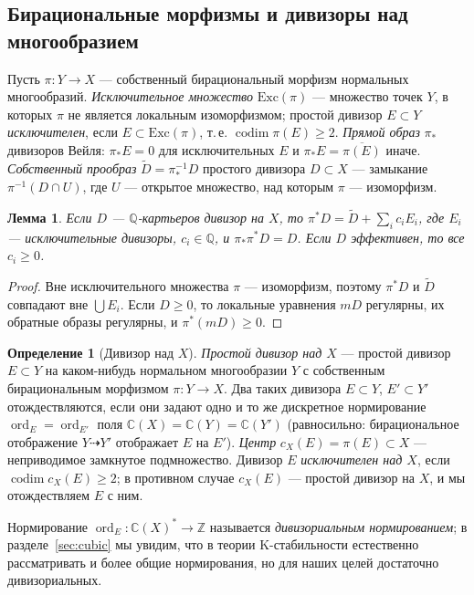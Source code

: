 \documentclass[11pt,a4paper]{article}
\theoremstyle{plain}
\newtheorem{lemma}[theorem]{Лемма}
\theoremstyle{definition}
\newtheorem{definition}[theorem]{Определение}
\theoremstyle{remark}
\renewcommand{\C}{\mathbb{C}}
\newcommand{\Z}{\mathbb{Z}}
\newcommand{\Q}{\mathbb{Q}}
\DeclareMathOperator{\ord}{ord}
\DeclareMathOperator{\codim}{codim}
\begin{document}
\subsection{Бирациональные морфизмы и дивизоры над многообразием}\label{ss:divisors-over}

Пусть $\pi\colon Y\to X$ --- собственный бирациональный морфизм нормальных многообразий.
\emph{Исключительное множество} $\mathrm{Exc}(\pi)$ --- множество точек $Y$, в которых $\pi$ не
является локальным изоморфизмом; простой дивизор $E\subset Y$ \emph{исключителен}, если
$E\subset\mathrm{Exc}(\pi)$, т.\,е. $\codim\pi(E)\ge2$. \emph{Прямой образ} $\pi_*$ дивизоров
Вейля: $\pi_*E=0$ для исключительных $E$ и $\pi_*E=\overline{\pi(E)}$ иначе. \emph{Собственный
прообраз} $\tilde D=\pi^{-1}_*D$ простого дивизора $D\subset X$ --- замыкание $\pi^{-1}(D\cap U)$,
где $U$ --- открытое множество, над которым $\pi$ --- изоморфизм.

\begin{lemma}\label{lem:pullback-exc}
Если $D$ --- $\Q$-картьеров дивизор на $X$, то $\pi^*D=\tilde D+\sum_i c_iE_i$, где $E_i$ ---
исключительные дивизоры, $c_i\in\Q$, и $\pi_*\pi^*D=D$. Если $D$ эффективен, то все $c_i\ge0$.
\end{lemma}
\begin{proof}
Вне исключительного множества $\pi$ --- изоморфизм, поэтому $\pi^*D$ и $\tilde D$ совпадают вне
$\bigcup E_i$. Если $D\ge0$, то локальные уравнения $mD$ регулярны, их обратные образы регулярны,
и $\pi^*(mD)\ge0$.
\end{proof}

\begin{definition}[Дивизор над $X$]\label{def:divisor-over}
\emph{Простой дивизор над $X$} --- простой дивизор $E\subset Y$ на каком-нибудь нормальном
многообразии $Y$ с собственным бирациональным морфизмом $\pi\colon Y\to X$. Два таких дивизора
$E\subset Y$, $E'\subset Y'$ отождествляются, если они задают одно и то же дискретное нормирование
$\ord_E=\ord_{E'}$ поля $\C(X)=\C(Y)=\C(Y')$ (равносильно: бирациональное отображение
$Y\dashrightarrow Y'$ отображает $E$ на $E'$). \emph{Центр} $c_X(E)=\pi(E)\subset X$ ---
неприводимое замкнутое подмножество. Дивизор $E$ \emph{исключителен над $X$}, если $\codim c_X(E)\ge2$;
в противном случае $c_X(E)$ --- простой дивизор на $X$, и мы отождествляем $E$ с ним.
\end{definition}

Нормирование $\ord_E\colon\C(X)^*\to\Z$ называется \emph{дивизориальным нормированием}; в
разделе~\ref{sec:cubic} мы увидим, что в теории K-стабильности естественно рассматривать и более
общие нормирования, но для наших целей достаточно дивизориальных.
\end{document}
